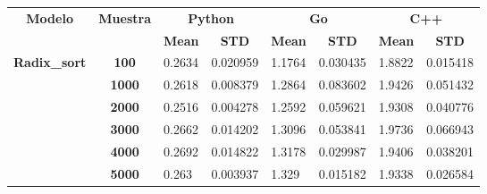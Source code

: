 \documentclass{article}
\begin{document}
\begin{table}[]
\begin{tabular}{|c|c|ll|ll|ll|}
\hline
\multirow{2}{*}{\textbf{Modelo}}       & \multirow{2}{*}{\textbf{Muestra}} & \multicolumn{2}{c|}{\textbf{Python}}                                   & \multicolumn{2}{c|}{\textbf{Go}}                                       & \multicolumn{2}{c|}{\textbf{C++}}                                      \\ \cline{3-8} 
                                       &                                   & \multicolumn{1}{c|}{\textbf{Mean}} & \multicolumn{1}{c|}{\textbf{STD}} & \multicolumn{1}{c|}{\textbf{Mean}} & \multicolumn{1}{c|}{\textbf{STD}} & \multicolumn{1}{c|}{\textbf{Mean}} & \multicolumn{1}{c|}{\textbf{STD}} \\ \hline
\multirow{15}{*}{\textbf{Radix\_sort}} & \textbf{100}                      & \multicolumn{1}{l|}{0.2634}        & 0.020959                          & \multicolumn{1}{l|}{1.1764}        & 0.030435                          & \multicolumn{1}{l|}{1.8822}        & 0.015418                          \\ \cline{2-8} 
                                       & \textbf{1000}                     & \multicolumn{1}{l|}{0.2618}        & 0.008379                          & \multicolumn{1}{l|}{1.2864}        & 0.083602                          & \multicolumn{1}{l|}{1.9426}        & 0.051432                          \\ \cline{2-8} 
                                       & \textbf{2000}                     & \multicolumn{1}{l|}{0.2516}        & 0.004278                          & \multicolumn{1}{l|}{1.2592}        & 0.059621                          & \multicolumn{1}{l|}{1.9308}        & 0.040776                          \\ \cline{2-8} 
                                       & \textbf{3000}                     & \multicolumn{1}{l|}{0.2662}        & 0.014202                          & \multicolumn{1}{l|}{1.3096}        & 0.053841                          & \multicolumn{1}{l|}{1.9736}        & 0.066943                          \\ \cline{2-8} 
                                       & \textbf{4000}                     & \multicolumn{1}{l|}{0.2692}        & 0.014822                          & \multicolumn{1}{l|}{1.3178}        & 0.029987                          & \multicolumn{1}{l|}{1.9406}        & 0.038201                          \\ \cline{2-8} 
                                       & \textbf{5000}                     & \multicolumn{1}{l|}{0.263}         & 0.003937                          & \multicolumn{1}{l|}{1.329}         & 0.015182                          & \multicolumn{1}{l|}{1.9338}        & 0.026584                          \\ \cline{2-8} 

\end{tabular}
\end{table}
\end{document}
